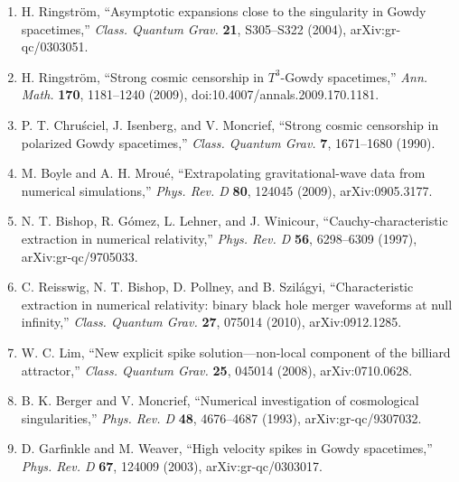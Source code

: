 \begin{enumerate}
\item H. Ringstr\"om, ``Asymptotic expansions close to the singularity in Gowdy
spacetimes,'' \emph{Class. Quantum Grav.} \textbf{21}, S305--S322 (2004), arXiv:gr-qc/0303051.

\item H. Ringstr\"om, ``Strong cosmic censorship in $T^3$-Gowdy spacetimes,''
\emph{Ann. Math.} \textbf{170}, 1181--1240 (2009), doi:10.4007/annals.2009.170.1181.

\item P. T. Chru\'sciel, J. Isenberg, and V. Moncrief, ``Strong cosmic censorship
in polarized Gowdy spacetimes,'' \emph{Class. Quantum Grav.} \textbf{7}, 1671--1680 (1990).

\item M. Boyle and A. H. Mrou\'e, ``Extrapolating gravitational-wave data from
numerical simulations,'' \emph{Phys. Rev. D} \textbf{80}, 124045 (2009), arXiv:0905.3177.

\item N. T. Bishop, R. G\'omez, L. Lehner, and J. Winicour,
``Cauchy-characteristic extraction in numerical relativity,'' \emph{Phys. Rev. D} \textbf{56}, 6298--6309 (1997), arXiv:gr-qc/9705033.

\item C. Reisswig, N. T. Bishop, D. Pollney, and B. Szil\'agyi,
``Characteristic extraction in numerical relativity: binary black hole merger waveforms at null infinity,'' \emph{Class. Quantum Grav.} \textbf{27}, 075014 (2010), arXiv:0912.1285.

\item W. C. Lim, ``New explicit spike solution---non-local component of the
billiard attractor,'' \emph{Class. Quantum Grav.} \textbf{25}, 045014 (2008), arXiv:0710.0628.

\item B. K. Berger and V. Moncrief, ``Numerical investigation of cosmological
singularities,'' \emph{Phys. Rev. D} \textbf{48}, 4676--4687 (1993), arXiv:gr-qc/9307032.

\item D. Garfinkle and M. Weaver, ``High velocity spikes in Gowdy spacetimes,''
\emph{Phys. Rev. D} \textbf{67}, 124009 (2003), arXiv:gr-qc/0303017.
\end{enumerate}
